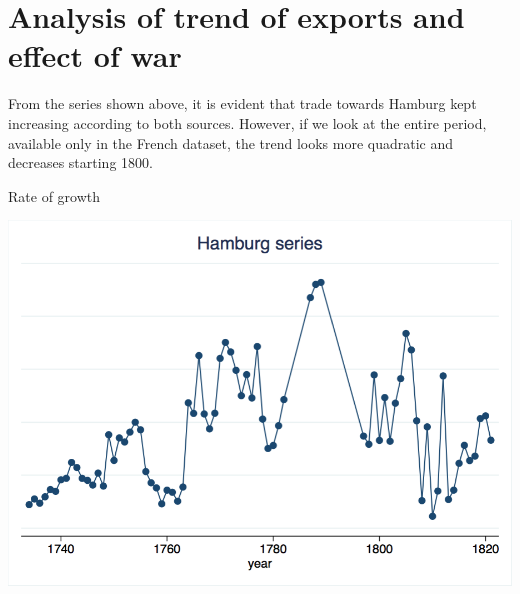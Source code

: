 \documentclass[12pt,a4paper,titlepage,english]{article}
\begin{document}
\section{Analysis of trend of exports and effect of war}
From the series shown above, it is evident that trade towards Hamburg kept increasing according to both sources. However, if we look at the entire period, available only in the French dataset, the trend looks more quadratic and decreases starting 1800. 
\begin{center}
\caption{Rate of growth}
\includegraphics[scale=.35]{growth_rate.png}
\end{center}
\end{document}

